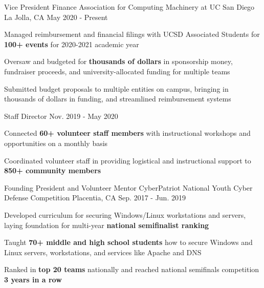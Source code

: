 \begin{cventries}
  \cventrytwo
    {Vice President Finance} %
    {Association for Computing Machinery at UC San Diego} %
    {La Jolla, CA} %
    {May 2020 - Present} %
    {
      \begin{cvitems} %
        \item {Managed reimbursement and financial filings with UCSD Associated Students for \textbf{100+ events} for 2020-2021 academic year}
        \item {Oversaw and budgeted for \textbf{thousands of dollars} in sponsorship money, fundraiser proceeds, and university-allocated funding for multiple teams}
        \item {Submitted budget proposals to multiple entities on campus, bringing in thousands of dollars in funding, and streamlined reimbursement systems}
      \end{cvitems}
    }
    {Staff Director} %
    {Nov. 2019 - May 2020} %
    {
      \begin{cvitems} %
        \item {Connected \textbf{60+ volunteer staff members} with instructional workshops and opportunities on a monthly basis}
        \item {Coordinated volunteer staff in providing logistical and instructional support to \textbf{850+ community members}}
      \end{cvitems}
    }

  \cventry
    {Founding President and Volunteer Mentor} %
    {CyberPatriot National Youth Cyber Defense Competition} %
    {Placentia, CA} %
    {Sep. 2017 - Jun. 2019} %
    {
      \begin{cvitems} %
        \item {Developed curriculum for securing Windows/Linux workstations and servers, laying foundation for multi-year \textbf{national semifinalist ranking}}
        \item {Taught \textbf{70+ middle and high school students} how to secure Windows and Linux servers, workstations, and services like Apache and DNS}
        \item {Ranked in \textbf{top 20 teams} nationally and reached national semifinals competition \textbf{3 years in a row}}
      \end{cvitems}
    }

\end{cventries}
